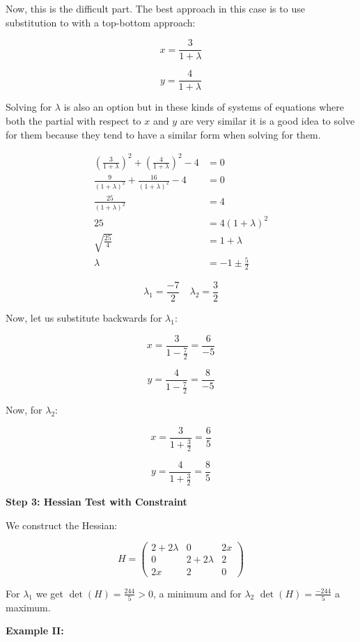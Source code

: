 Now, this is the difficult part. The best approach in this case is to use substitution to 
with a top-bottom approach:

\[
    x = \frac{3}{1 + \lambda}
\]

\[
    y = \frac{4}{1 + \lambda}
\]

Solving for \(\lambda\) is also an option but in these kinds of systems of equations where 
both the partial with respect to \(x\) and \(y\) are very similar it is a good idea to solve for them 
because they tend to have a similar form when solving for them.

\begin{align*}
    \left(\frac{3}{1 + \lambda}\right)^2 + \left(\frac{4}{1 + \lambda}\right)^2 - 4 &= 0\\
    \frac{9}{(1 + \lambda)^2} + \frac{16}{(1 + \lambda)^2} - 4 &= 0\\
    \frac{25}{(1 + \lambda)^2} &= 4 \\
    25 &= 4 (1 + \lambda)^2 \\
    \sqrt{\frac{25}{4}} &= 1 + \lambda \\
    \lambda &= -1 \pm \frac{5}{2}
\end{align*}

\[
    \lambda_1 = \frac{-7}{2} \quad \lambda_2 = \frac{3}{2}
\]

Now, let us substitute backwards for \(\lambda_1\):

\[
    x = \frac{3}{1 - \frac{7}{2}} = \frac{6}{-5}
\]

\[
    y = \frac{4}{1 - \frac{7}{2}} = \frac{8}{-5}
\]

Now,  for \(\lambda_2\):

\[
    x = \frac{3}{1 + \frac{3}{2}} = \frac{6}{5}
\]

\[
    y = \frac{4}{1 + \frac{3}{2}} = \frac{8}{5}
\]

\textbf{Step 3: Hessian Test with Constraint}

We construct the Hessian:

\[
    H = \begin{pmatrix}
    2 + 2\lambda & 0 & 2x \\
    0 & 2 + 2\lambda & 2 \\
    2x & 2 & 0
    \end{pmatrix}
\]

For \(\lambda_1\) we get \( \det(H) =  \frac{244}{5} > 0 \), a minimum 
and for \(\lambda_2\) \(\det(H) = \frac{-244}{5}\) a maximum.

\textbf{Example II:}

